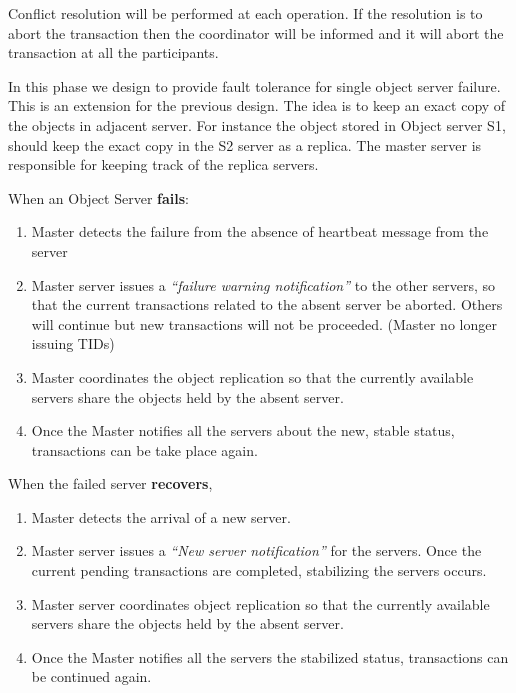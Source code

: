 \documentclass[times, 10pt,twocolumn]{article}
\begin{document}
Conflict resolution will be performed at each operation. If the resolution is to abort the transaction then the coordinator will be informed and it will abort the transaction at all the participants.

\label{subsec:faultol}
In this phase we design to provide fault tolerance for single object server failure. This is an extension for the previous design. The idea is to keep an exact copy of the objects in adjacent server.
For instance the object stored in Object server S1, should keep the exact copy in the S2 server as a replica. The master server is responsible for keeping track of the replica servers.

When an Object Server {\bf fails}:
\begin{enumerate}
\item Master detects the failure from the absence of heartbeat message from the server
\item Master server issues a {\it “failure warning notification”} to the other servers, so that the current transactions related to the absent server be aborted.
Others will continue but new transactions will not be proceeded. (Master no longer issuing TIDs)
\item Master coordinates the object replication so that the currently available servers share the objects held by the absent server.
\item Once the Master notifies all the servers about the new, stable status, transactions can be take place again.
\end{enumerate}

When the failed server {\bf recovers},
\begin{enumerate}
\item Master detects the arrival of a new server.
\item Master server issues a {\it “New server notification”} for the servers. Once the current pending transactions are completed, stabilizing the servers occurs.
\item Master server coordinates object replication so that the currently available servers share the objects held by the absent server.
\item Once the Master notifies all the servers the stabilized status, transactions can be continued again.
\end{enumerate}
\end{document}
